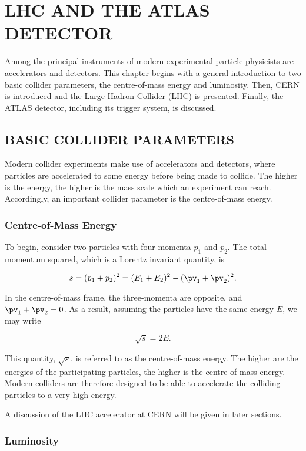 \chapter{LHC AND THE ATLAS DETECTOR}\label{c:detector}

Among the principal instruments of modern experimental particle physicists are
accelerators and detectors. This chapter begins with a general introduction to
two basic collider parameters, the centre-of-mass energy and luminosity. Then,
CERN is introduced and the Large Hadron Collider (LHC) is presented. Finally,
the ATLAS detector, including its trigger system, is discussed.


\section{BASIC COLLIDER  PARAMETERS}

Modern collider experiments make use of accelerators and detectors, where
particles are accelerated to some energy before being made to collide. The
higher is the energy, the higher is the mass scale which an experiment can
reach. Accordingly, an important collider parameter is the centre-of-mass
energy.

\subsection{Centre-of-Mass Energy}

To begin, consider two particles with four-momenta $p_1$ and $p_2$. The total
momentum squared, which is a Lorentz invariant quantity, is

$$
	s = (p_1 + p_2)^2  = (E_1 + E_2)^2 - (\pv_1 + \pv_2)^2.
$$

In the centre-of-mass frame, the three-momenta are opposite, and $\pv_1+\pv_2 =
	0$. As a result, assuming the particles have the same energy $E$, we may write

\begin{equation}
	\sqrt{s} = 2E.
\end{equation}

This quantity, $\sqrt{s}$, is referred to as the centre-of-mass energy. The
higher are the energies of the participating particles, the higher is the
centre-of-mass energy. Modern colliders are therefore designed to be able to
accelerate the colliding particles to a very high energy.

A discussion of the LHC accelerator at CERN will be given in later sections.

\subsection{Luminosity}

